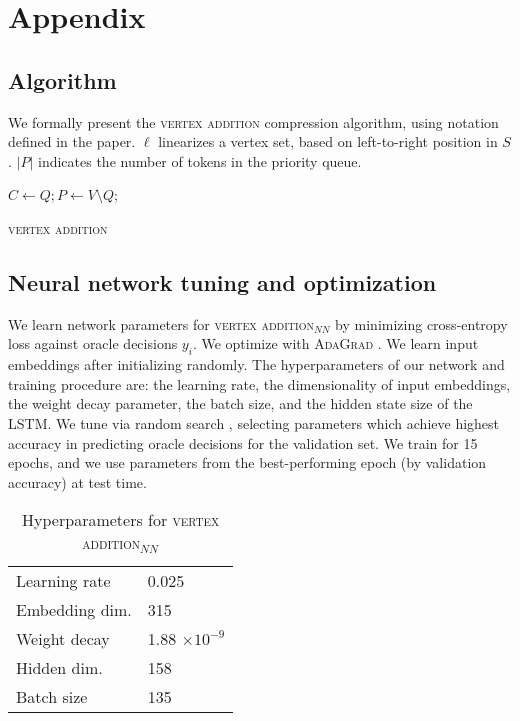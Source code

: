 \appendix

\section{Appendix}

\subsection{Algorithm}
We formally present the \textsc{vertex addition} compression algorithm, using notation defined in the paper. $\ell$ linearizes a vertex set, based on left-to-right position in $S$. $|P|$ indicates the number of tokens in the priority queue.

\begin{algorithm}[]
\SetAlgoLined
{}
 $ C \gets Q;  P \gets V \setminus Q$; \\
 \caption{\textsc{vertex addition}}
\end{algorithm}\label{a:algo}

\subsection{Neural network tuning and optimization}

We learn network parameters for \textsc{vertex addition}$_{NN}$ by minimizing cross-entropy loss against oracle decisions $y_i$. We optimize with \textsc{AdaGrad} \cite{duchi2011adaptive}. We learn input embeddings after initializing randomly. The hyperparameters of our network and training procedure are: the learning rate, the dimensionality of input embeddings, the weight decay parameter, the batch size, and the hidden state size of the LSTM. We tune via random search \cite{Bergstra2012RandomSF}, selecting parameters which achieve highest accuracy in predicting oracle decisions for the validation set. We train for 15 epochs, and we use parameters from the best-performing epoch (by validation accuracy) at test time.

\begin{table}[htb!]
\centering
\begin{tabular}{ll}
Learning rate & 0.025 \\ 
Embedding dim. &  315 \\
Weight decay   & 1.88 $ \times 10^{-9}$ \\
Hidden dim. & 158  \\
Batch size & 135 \\
\end{tabular}
\caption{Hyperparameters for \textsc{vertex addition}$_{NN}$}\label{t:params}
\end{table}

